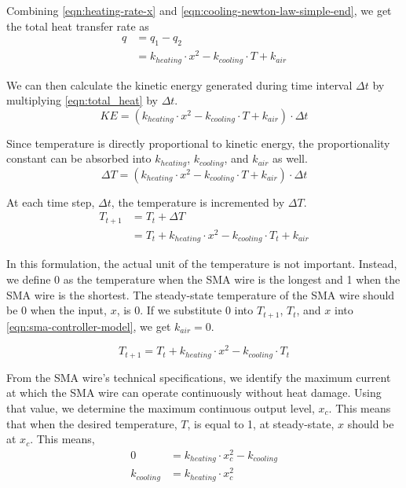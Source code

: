 Combining \eqref{eqn:heating-rate-x} and \eqref{eqn:cooling-newton-law-simple-end}, we get the total heat transfer rate as 
\begin{subequations}
	\begin{flalign}
	q &= q_1 - q_2 \\
	&= k_{heating} \cdot x^2 - k_{cooling} \cdot T + k_{air}\label{eqn:total_heat}
	\end{flalign}
\end{subequations}

We can then calculate the kinetic energy generated during time interval $\Delta t$ by multiplying \eqref{eqn:total_heat} by $\Delta t$.
\begin{equation}
KE =  (k_{heating} \cdot x^2 - k_{cooling} \cdot T + k_{air}) \cdot \Delta t \label{eqn:total_KE}
\end{equation}

Since temperature is directly proportional to kinetic energy, the proportionality constant can be absorbed into $k_{heating}$, $k_{cooling}$, and $ k_{air}$ as well. 
\begin{equation}
\Delta T =  (k_{heating} \cdot x^2 - k_{cooling} \cdot T  + k_{air}) \cdot \Delta t\label{eqn:delta_T}
\end{equation}

At each time step, $\Delta t$, the temperature is incremented by $\Delta T$.  
\begin{subequations}
	\begin{flalign}
	T_{t+1} &=  T_{t} + \Delta T \\
	&=  T_{t} + k_{heating} \cdot x^2 - k_{cooling} \cdot T_{t}  + k_{air}\label{eqn:sma-controller-model}
	\end{flalign}
\end{subequations}

In this formulation, the actual unit of the temperature is not important. Instead, we define 0 as the temperature when the SMA wire is the longest and 1 when the SMA wire is the shortest. The steady-state temperature of the SMA wire should be 0 when the input, $x$, is 0. If we substitute 0 into $T_{t+1}$, $T_{t}$, and $x$ into \eqref{eqn:sma-controller-model}, we get $k_{air} = 0$. 

\begin{equation}\label{eqn:sma-controller-model-1}
T_{t+1} =  T_{t} + k_{heating} \cdot x^2 - k_{cooling} \cdot T_{t}
\end{equation}

From the SMA wire's technical specifications\cite{FlexinolTechSpecs}, we identify the maximum current at which the SMA wire can operate continuously without heat damage. Using that value, we determine the maximum continuous output level, $x_c$. This means that when the desired temperature, $T$, is equal to 1, at steady-state, $x$ should be at $x_c$. This means, 
\begin{subequations}
	\begin{flalign}
	0 &= k_{heating} \cdot x_c^2 - k_{cooling} \\
	k_{cooling} &=  k_{heating} \cdot x_c^2\label{eqn:k_cooling}
	\end{flalign}
\end{subequations}


